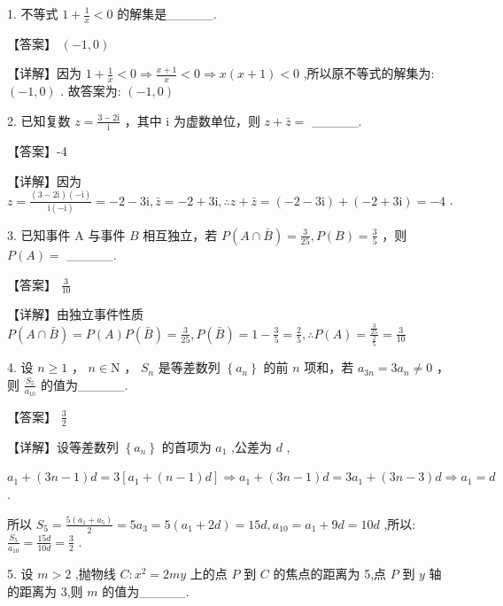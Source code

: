 \documentclass[10pt]{article}
\begin{document}
1. 不等式 \(1 + \frac{1}{x} < 0\) 的解集是\_\_\_\_\_.

【答案】 \(\left( {-1,0}\right)\)

【详解】因为 \(1 + \frac{1}{x} < 0 \Rightarrow  \frac{x + 1}{x} < 0 \Rightarrow  x\left( {x + 1}\right)  < 0\) ,所以原不等式的解集为: \(\left( {-1,0}\right)\) . 故答案为: \(\left( {-1,0}\right)\)

2. 已知复数 \(z = \frac{3 - 2\mathrm{i}}{\mathrm{i}}\) ，其中 \(\mathrm{i}\) 为虚数单位，则 \(z + \bar{z} =\) \_\_\_\_\_.

【答案】-4

【详解】因为 \(z = \frac{\left( {3 - 2\mathrm{i}}\right) \left( {-\mathrm{i}}\right) }{\mathrm{i}\left( {-\mathrm{i}}\right) } =  - 2 - 3\mathrm{i},\bar{z} =  - 2 + 3\mathrm{i},\therefore z + \bar{z} = \left( {-2 - 3\mathrm{i}}\right)  + \left( {-2 + 3\mathrm{i}}\right)  =  - 4\) .

3. 已知事件 \(\mathrm{A}\) 与事件 \(B\) 相互独立，若 \(P\left( {A \cap  \bar{B}}\right)  = \frac{3}{25},P\left( B\right)  = \frac{3}{5}\) ，则 \(P\left( A\right)  =\) \_\_\_\_\_.

【答案】 \(\frac{3}{10}\)

【详解】由独立事件性质 \(P\left( {A \cap  \bar{B}}\right)  = P\left( A\right) P\left( \bar{B}\right)  = \frac{3}{25},P\left( \bar{B}\right)  = 1 - \frac{3}{5} = \frac{2}{5},\therefore P\left( A\right)  = \frac{\frac{3}{25}}{\frac{2}{5}} = \frac{3}{10}\)

4. 设 \(n \geq  1\) ， \(n \in  \mathrm{N}\) ， \({S}_{n}\) 是等差数列 \(\left\{  {a}_{n}\right\}\) 的前 \(n\) 项和，若 \({a}_{3n} = 3{a}_{n} \neq  0\) ，则 \(\frac{{S}_{5}}{{a}_{10}}\) 的值为\_\_\_\_\_.

【答案】 \(\frac{3}{2}\)

【详解】设等差数列 \(\left\{  {a}_{n}\right\}\) 的首项为 \({a}_{1}\) ,公差为 \(d\) ,

\({a}_{1} + \left( {{3n} - 1}\right) d = 3\left\lbrack  {{a}_{1} + \left( {n - 1}\right) d}\right\rbrack   \Rightarrow  {a}_{1} + \left( {{3n} - 1}\right) d = 3{a}_{1} + \left( {{3n} - 3}\right) d \Rightarrow  {a}_{1} = d\) .

所以 \({S}_{5} = \frac{5\left( {{a}_{1} + {a}_{5}}\right) }{2} = 5{a}_{3} = 5\left( {{a}_{1} + {2d}}\right)  = {15d},{a}_{10} = {a}_{1} + {9d} = {10d}\) ,所以: \(\frac{{S}_{5}}{{a}_{10}} = \frac{15d}{10d} = \frac{3}{2}\) .

5. 设 \(m > 2\) ,抛物线 \(C : {x}^{2} = {2my}\) 上的点 \(P\) 到 \(C\) 的焦点的距离为 5,点 \(P\) 到 \(y\) 轴的距离为 3,则 \(m\) 的值为\_\_\_\_\_.
\end{document}
